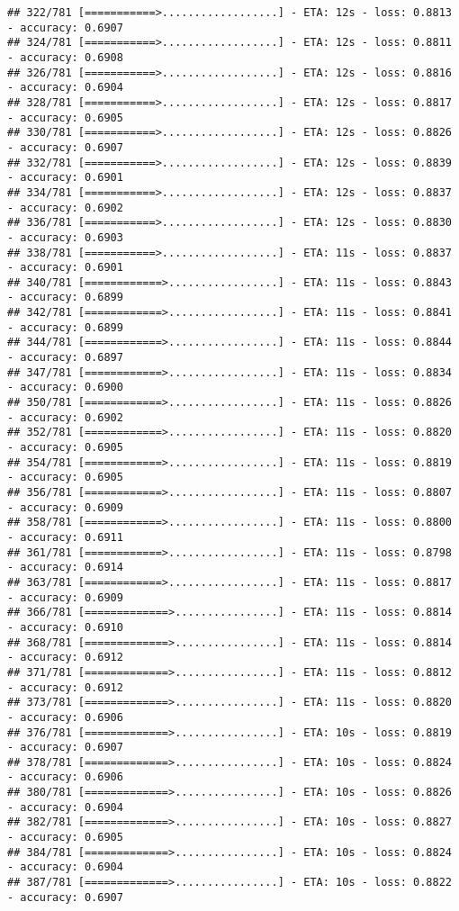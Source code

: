 \documentclass[
]{article}
\begin{document}
\begin{verbatim}
## 322/781 [===========>..................] - ETA: 12s - loss: 0.8813 - accuracy: 0.6907
## 324/781 [===========>..................] - ETA: 12s - loss: 0.8811 - accuracy: 0.6908
## 326/781 [===========>..................] - ETA: 12s - loss: 0.8816 - accuracy: 0.6904
## 328/781 [===========>..................] - ETA: 12s - loss: 0.8817 - accuracy: 0.6905
## 330/781 [===========>..................] - ETA: 12s - loss: 0.8826 - accuracy: 0.6907
## 332/781 [===========>..................] - ETA: 12s - loss: 0.8839 - accuracy: 0.6901
## 334/781 [===========>..................] - ETA: 12s - loss: 0.8837 - accuracy: 0.6902
## 336/781 [===========>..................] - ETA: 12s - loss: 0.8830 - accuracy: 0.6903
## 338/781 [===========>..................] - ETA: 11s - loss: 0.8837 - accuracy: 0.6901
## 340/781 [============>.................] - ETA: 11s - loss: 0.8843 - accuracy: 0.6899
## 342/781 [============>.................] - ETA: 11s - loss: 0.8841 - accuracy: 0.6899
## 344/781 [============>.................] - ETA: 11s - loss: 0.8844 - accuracy: 0.6897
## 347/781 [============>.................] - ETA: 11s - loss: 0.8834 - accuracy: 0.6900
## 350/781 [============>.................] - ETA: 11s - loss: 0.8826 - accuracy: 0.6902
## 352/781 [============>.................] - ETA: 11s - loss: 0.8820 - accuracy: 0.6905
## 354/781 [============>.................] - ETA: 11s - loss: 0.8819 - accuracy: 0.6905
## 356/781 [============>.................] - ETA: 11s - loss: 0.8807 - accuracy: 0.6909
## 358/781 [============>.................] - ETA: 11s - loss: 0.8800 - accuracy: 0.6911
## 361/781 [============>.................] - ETA: 11s - loss: 0.8798 - accuracy: 0.6914
## 363/781 [============>.................] - ETA: 11s - loss: 0.8817 - accuracy: 0.6909
## 366/781 [=============>................] - ETA: 11s - loss: 0.8814 - accuracy: 0.6910
## 368/781 [=============>................] - ETA: 11s - loss: 0.8814 - accuracy: 0.6912
## 371/781 [=============>................] - ETA: 11s - loss: 0.8812 - accuracy: 0.6912
## 373/781 [=============>................] - ETA: 11s - loss: 0.8820 - accuracy: 0.6906
## 376/781 [=============>................] - ETA: 10s - loss: 0.8819 - accuracy: 0.6907
## 378/781 [=============>................] - ETA: 10s - loss: 0.8824 - accuracy: 0.6906
## 380/781 [=============>................] - ETA: 10s - loss: 0.8826 - accuracy: 0.6904
## 382/781 [=============>................] - ETA: 10s - loss: 0.8827 - accuracy: 0.6905
## 384/781 [=============>................] - ETA: 10s - loss: 0.8824 - accuracy: 0.6904
## 387/781 [=============>................] - ETA: 10s - loss: 0.8822 - accuracy: 0.6907

\end{verbatim}
\end{document}
